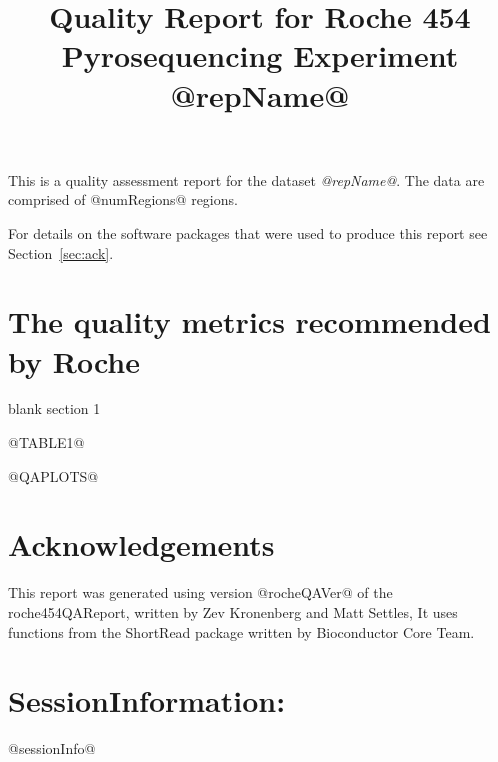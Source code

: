 \documentclass[11pt]{article}
\newcommand{\Rpackage}[1]{{\textsf{#1}}}
\begin{document}
\title{Quality Report for Roche 454 Pyrosequencing Experiment 
\\
@repName@}

\maketitle
\tableofcontents

\vspace{1.08cm}
This is a quality assessment report for the dataset \textit{@repName@}.  
The data are comprised of @numRegions@ regions.

For details on the software packages that were used to produce this
report see Section~\ref{sec:ack}.

\section{The quality metrics recommended by Roche}

blank section 1


@TABLE1@

@QAPLOTS@


\section*{Acknowledgements}
\label{sec:ack}

This report was generated using version @rocheQAVer@ of the 
\Rpackage{roche454QAReport}, written by Zev Kronenberg and Matt Settles,
It uses functions from the \Rpackage{ShortRead} package
written by Bioconductor Core Team. 
\section*{SessionInformation: }
@sessionInfo@
\end{document}
